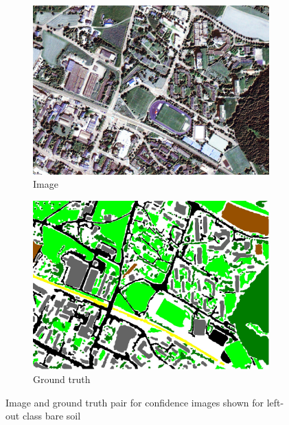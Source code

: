 \documentclass[10pt]{article}
\begin{document}
\begin{figure}[H]
	\centering
	\begin{subfigure}{.32\textwidth} 
		\includegraphics[width=\textwidth]{Im_19}
		\caption{Image}
	\end{subfigure}
	\begin{subfigure}{.32\textwidth}
		\includegraphics[width=\textwidth]{GT_19}
		\caption{Ground truth}
	\end{subfigure}
	\caption{Image and ground truth pair for confidence images shown for left-out class bare soil}
\end{figure}
\end{document}
